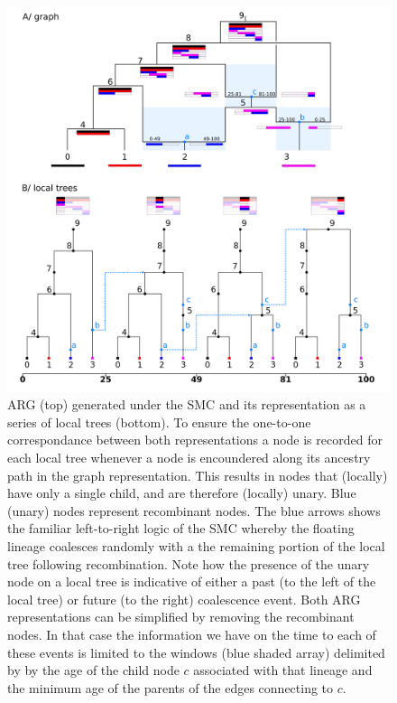 \documentclass{article}
\begin{document}
\begin{figure}[!ht]
\centering
\includegraphics[width=\textwidth]{figures/smc_custom_2rows_area_full_hap.png}
\caption{ARG (top) generated under the SMC and its representation as a
series of local trees (bottom). To ensure the one-to-one correspondance
between both representations a node is recorded for each local tree whenever
a node is encoundered along its ancestry path in the graph representation.
This results in nodes that (locally) have only a single child, and are therefore
(locally) unary. Blue (unary) nodes represent recombinant nodes.
The blue arrows shows the familiar left-to-right logic of the SMC whereby
the floating lineage coalesces randomly
with a the remaining portion of the local tree following recombination.
Note how the presence of the unary node on a local tree is
indicative of either a past (to the left of the local tree)
or future (to the right) coalescence event.
Both ARG representations can be simplified by removing the recombinant nodes.
In that case the information we have on the time to each of these events is
limited to the windows (blue shaded array) delimited by by the age of
the child node $c$ associated with that lineage and the minimum age of
the parents of the edges connecting to $c$.
}
\label{fig:smc-unary}
\end{figure}
\end{document}
